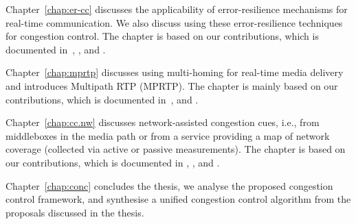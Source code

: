 Chapter~\ref{chap:er-cc} discusses the applicability of error-resilience
mechanisms for real-time communication. We also discuss using these
error-resilience techniques for congestion control. The chapter is based on
our contributions, which is documented in~\cite{draft.adaptive.fec, draft.1d2d.fec},
, and .


Chapter~\ref{chap:mprtp} discusses using multi-homing for real-time media
delivery and introduces Multipath RTP (MPRTP). The chapter is mainly based on
our contributions, which is documented in~\cite{draft.mprtp, draft.mprtp.sdp,
Globisch:AsymGrpComm, draft.rtcp.overlay}, and .



Chapter~\ref{chap:cc.nw} discusses network-assisted congestion cues, i.e.,
from middleboxes in the media path or from a service providing a map of
network coverage (collected via active or passive measurements). The chapter
is based on our contributions, which is documented in \cite{glass:patent}, 
, and .


Chapter~\ref{chap:conc} concludes the thesis, we analyse the proposed
congestion control framework, and synthesise a unified congestion control
algorithm from the proposals discussed in the thesis.
